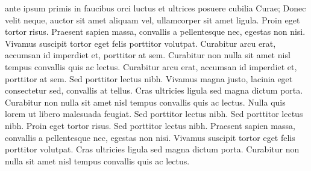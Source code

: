 \documentclass{article}
\begin{document}
ante ipsum primis in faucibus orci luctus et ultrices posuere cubilia Curae; Donec velit neque, auctor sit amet aliquam vel, ullamcorper sit amet ligula. Proin eget tortor risus. Praesent sapien massa, convallis a pellentesque nec, egestas non nisi. Vivamus suscipit tortor eget felis porttitor volutpat. Curabitur arcu erat, accumsan id imperdiet et, porttitor at sem. Curabitur non nulla sit amet nisl tempus convallis quis ac lectus. Curabitur arcu erat, accumsan id imperdiet et, porttitor at sem. Sed porttitor lectus nibh. Vivamus magna justo, lacinia eget consectetur sed, convallis at tellus. Cras ultricies ligula sed magna dictum porta. Curabitur non nulla sit amet nisl tempus convallis quis ac lectus. Nulla quis lorem ut libero malesuada feugiat. Sed porttitor lectus nibh. Sed porttitor lectus nibh. Proin eget tortor risus. Sed porttitor lectus nibh. Praesent sapien massa, convallis a pellentesque nec, egestas non nisi. Vivamus suscipit tortor eget felis porttitor volutpat. Cras ultricies ligula sed magna dictum porta. Curabitur non nulla sit amet nisl tempus convallis quis ac lectus.

\endnumbering
\end{document}
